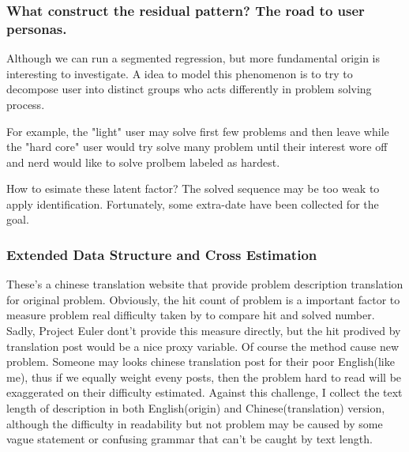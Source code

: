 \documentclass{beamer}
\begin{document}
\begin{frame}

\frametitle{What construct the residual pattern? The road to user personas. }

Although we can run a segmented regression, but more fundamental origin is interesting to investigate.
A idea to model this phenomenon is to try to decompose user into distinct groups
who acts differently in problem solving process. 

For example, the "light" user may solve first few problems and then leave while the "hard core" 
user would try solve many problem until their interest wore off and nerd would like to solve prolbem
labeled as hardest. 

How to esimate these latent factor? The solved sequence may be too weak to apply identification. 
Fortunately, some extra-date have been collected for the goal.



\end{frame}

\begin{frame}

\frametitle{Extended Data Structure and Cross Estimation}

These's a chinese translation website that provide problem description translation for original problem.
Obviously, the hit count of problem is a important factor to measure problem real difficulty taken by to compare 
hit and solved number. Sadly, Project Euler dont't provide this measure directly, 
but the hit prodived by translation post would be a nice proxy variable. Of course the method cause new problem.
Someone may looks chinese translation post for their poor English(like me), 
thus if we equally weight eveny posts, then the problem hard to read will be exaggerated on their difficulty estimated.
Against this challenge, I collect the text length of description in both English(origin) and Chinese(translation) version,
although the difficulty in readability but not problem may be caused by some vague statement or confusing grammar
that can't be caught by text length.


\end{frame}
\end{document}
